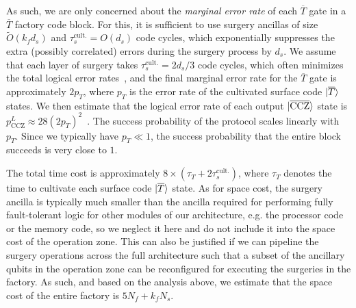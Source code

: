 \documentclass[reprint,twocolumn,secnumarabic,amssymb, aps, prx]{revtex4-2}
\newcommand{\Nf}{N_f}
\newcommand{\kf}{k_f}
\newcommand{\Ns}{N_s}
\newcommand{\ds}{d_s}
\newcommand{\tauscult}{\tau_s^{\text{cult.}}}
\newcommand{\lket}[1]{\ket{\overline{#1}}}
\newcommand{\ccz}{\ket{\overline{\text{CCZ}}}}
\begin{document}
As such, we are only concerned about the \emph{marginal error rate} of each $\overline{T}$ gate in a $\overline{T}$ factory code block. For this, it is sufficient to use surgery ancillas of size $\tilde{O}(\kf \ds)$ and $\tauscult = O(\ds)$ code cycles, which exponentially suppresses the extra (possibly correlated) errors during the surgery process by $\ds$. We assume that each layer of surgery takes $\tauscult = 2\ds/3$ code cycles, which often minimizes the total logical error rates~\cite{cross2024improved}, and the final marginal error rate for the $\overline{T}$ gate is approximately $2 p_T$, where $p_T$ is the error rate of the cultivated surface code $\lket{T}$ states. We then estimate that the logical error rate of each output $\ccz$ state is $p^L_{\mathrm{CCZ}}  \approx 28(2 p_T)^2$~\cite{litinski2019magic}. The success probability of the protocol scales linearly with $p_T$. Since we typically have $p_T \ll 1$, the success probability that the entire block succeeds is very close to $1$.

The total time cost is approximately \mbox{$8\times (\tau_T + 2\tauscult)$}, where $\tau_T$ denotes the time to cultivate each surface code $\lket{T}$ state. As for space cost, the surgery ancilla is typically much smaller than the ancilla required for performing fully fault-tolerant logic for other modules of our architecture, e.g. the processor code or the memory code, so we neglect it here and do not include it into the space cost of the operation zone. This can also be justified if we can pipeline the surgery operations across the full architecture such that a subset of the ancillary qubits in the operation zone can be reconfigured for executing the surgeries in the factory. As such, and based on the analysis above, we estimate that the space cost of the entire factory is \mbox{$5 \Nf + \kf \Ns$}.
\end{document}
